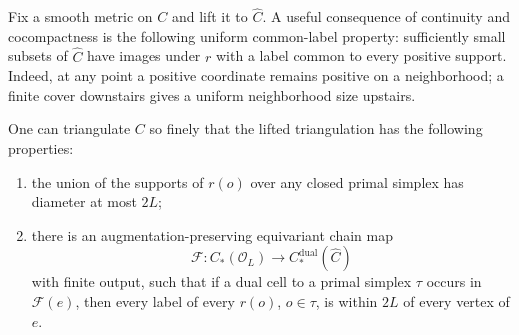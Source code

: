 Fix a smooth metric on $C$ and lift it to $\widehat C$.  A useful
consequence of continuity and cocompactness is the following uniform
common-label property: sufficiently small subsets of $\widehat C$ have
images under $r$ with a label common to every positive support.  Indeed,
at any point a positive coordinate remains positive on a neighborhood;
a finite cover downstairs gives a uniform neighborhood size upstairs.

\begin{lemma}
\label{lem:dual-carrier}
One can triangulate $C$ so finely that the lifted triangulation has
the following properties:
\begin{enumerate}
\item the union of the supports of $r(o)$ over any closed primal
simplex has diameter at most $2L$;
\item there is an augmentation-preserving equivariant chain map
\[
 \mathcal F:C_*(\mathcal O_L)\longrightarrow
 C_*^{\mathrm{dual}}(\widehat C)
\]
with finite output, such that if a dual cell to a primal simplex
$\tau$ occurs in $\mathcal F(e)$, then every label of every $r(o)$,
$o\in\tau$, is within $2L$ of every vertex of $e$.
\end{enumerate}
\end{lemma}

